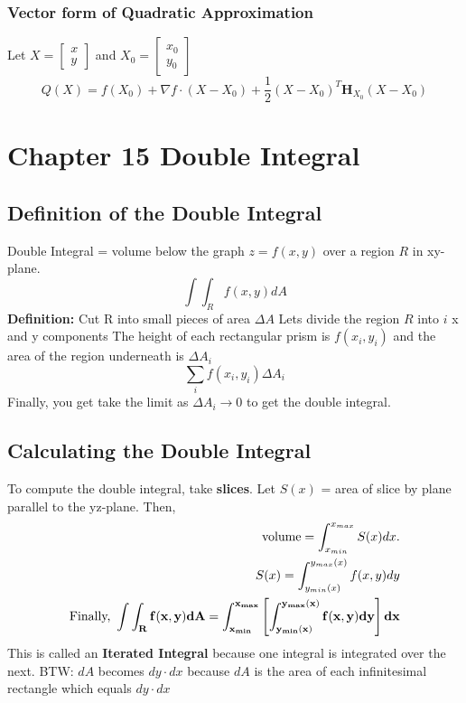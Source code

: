 \documentclass[12pt]{article}
\theoremstyle{break}
\numberwithin{theorem}{subsection}
\numberwithin{lemma}{subsection}
\numberwithin{corollary}{subsection}
\numberwithin{equation}{subsection}
\newcommand{\vect}[1]{\boldsymbol{#1}}
\begin{document}
\subsubsection{Vector form of Quadratic Approximation}
Let $X = \begin{bmatrix} x \\ y \end{bmatrix} $ and $X_0 = \begin{bmatrix} x_0 \\ y_0 \end{bmatrix} $
\begin{equation*}
	Q(X) = f(X_0) + \nabla f \cdot (X - X_0) + \frac12 (X - X_0)^T \vect{H}_{X_0} (X - X_0)
\end{equation*}


\section{Chapter 15 Double Integral}

\subsection{Definition of the Double Integral}
Double Integral = volume below the graph $z = f(x,y)$ over a region $R$ in xy-plane.
\begin{equation*}
	\int \int_R f(x,y)dA
\end{equation*}
\textbf{Definition: } Cut R into small pieces of area $\Delta A$
Lets divide the region $R$ into $i$ x and y components
The height of each rectangular prism is $f(x_i, y_i)$ and the area of the region underneath is $\Delta A_i$
\begin{equation*}
	\sum_i f(x_i,y_i) \Delta A_i 
\end{equation*}
Finally, you get take the limit as $\Delta A_i \to 0$ to get the double integral.

\subsection{Calculating the Double Integral}
To compute the double integral, take \textbf{slices}. 
Let $S(x)$ = area of slice by plane parallel to the yz-plane.
Then, 
\begin{align*}
	\text{volume} = \int_{x_{min}}^{x_{max}} S(x)dx. \\
	S(x) = \int_{y_{min}(x)}^{y_{max}(x)} f(x,y)dy \\
	{\bf \text{Finally, } \int \int_R f(x,y) dA = \int_{x_{min}}^{x_{max}} \left[ \int_{y_{min}(x)}^{y_{max}(x)} f(x,y) dy \right] dx}
\end{align*}
This is called an \textbf{Iterated Integral} because one integral is integrated over the next.
BTW: $dA$ becomes $dy \cdot dx$ because $dA$ is the area of each infinitesimal rectangle which equals $dy \cdot dx$
\end{document}
